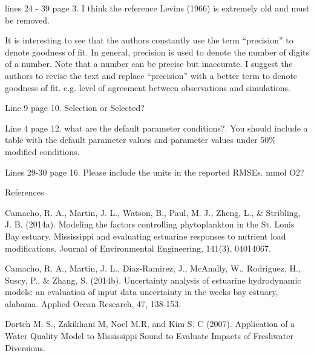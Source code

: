 \documentclass[letterpaper,12pt]{article}\usepackage[]{graphicx}\usepackage[]{color}
\begin{document}
lines 24 - 39 page 3. I think the reference Levins (1966) is extremely old and must be removed. 

It is interesting to see that the authors constantly use the term ``precision'' to denote goodness of fit. In general, precision is used to denote the number of digits of a number. Note that a number can be precise but inaccurate. I suggest the authors to revise the text and replace ``precision'' with a better term to denote goodness of fit. e.g. level of agreement between observations and simulations. 

Line 9 page 10. Selection or Selected?

Line 4 page 12. what are the default parameter conditions?. You should include a table with the default parameter values and parameter values under 50\% modified conditions. 

Lines 29-30 page 16. Please include the units in the reported RMSEs. mmol O2?

References

Camacho, R. A., Martin, J. L., Watson, B., Paul, M. J., Zheng, L., \& Stribling, J. B. (2014a). Modeling the factors controlling phytoplankton in the St. Louis Bay estuary, Mississippi and evaluating estuarine responses to nutrient load modifications. Journal of Environmental Engineering, 141(3), 04014067.

Camacho, R. A., Martin, J. L., Diaz-Ramirez, J., McAnally, W., Rodriguez, H., Suscy, P., \& Zhang, S. (2014b). Uncertainty analysis of estuarine hydrodynamic models: an evaluation of input data uncertainty in the weeks bay estuary, alabama. Applied Ocean Research, 47, 138-153.

Dortch M. S., Zakikhani M, Noel M.R, and Kim S. C (2007). Application of a Water Quality Model to Mississippi Sound to Evaluate Impacts of Freshwater Diversions.
\end{document}
